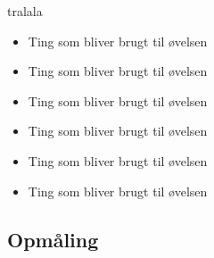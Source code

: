 tralala
                                   
\begin{itemize}
  \item    Ting som bliver brugt til øvelsen
  \item    Ting som bliver brugt til øvelsen
  \item    Ting som bliver brugt til øvelsen
  \item    Ting som bliver brugt til øvelsen
  \item    Ting som bliver brugt til øvelsen
  \item    Ting som bliver brugt til øvelsen
\end{itemize}

\subsection*{Opmåling} 